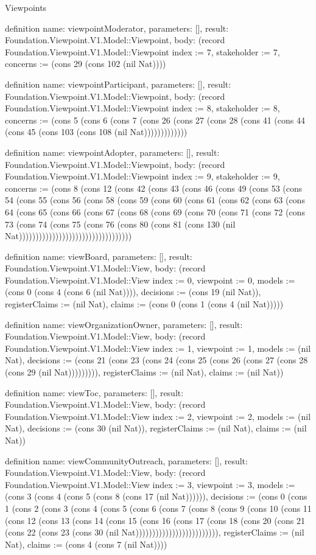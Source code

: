 \begin{lexlean}{Viewpoints}
\begin{semanticmodule}
definition{
  name: viewpointModerator,
  parameters: [],
  result: Foundation.Viewpoint.V1.Model::Viewpoint,
  body: (record Foundation.Viewpoint.V1.Model::Viewpoint {index := 7, stakeholder := 7, concerns := (cons 29 (cons 102 (nil Nat)))})
}

definition{
  name: viewpointParticipant,
  parameters: [],
  result: Foundation.Viewpoint.V1.Model::Viewpoint,
  body: (record Foundation.Viewpoint.V1.Model::Viewpoint {index := 8, stakeholder := 8, concerns := (cons 5 (cons 6 (cons 7 (cons 26 (cons 27 (cons 28 (cons 41 (cons 44 (cons 45 (cons 103 (cons 108 (nil Nat))))))))))))})
}

definition{
  name: viewpointAdopter,
  parameters: [],
  result: Foundation.Viewpoint.V1.Model::Viewpoint,
  body: (record Foundation.Viewpoint.V1.Model::Viewpoint {index := 9, stakeholder := 9, concerns := (cons 8 (cons 12 (cons 42 (cons 43 (cons 46 (cons 49 (cons 53 (cons 54 (cons 55 (cons 56 (cons 58 (cons 59 (cons 60 (cons 61 (cons 62 (cons 63 (cons 64 (cons 65 (cons 66 (cons 67 (cons 68 (cons 69 (cons 70 (cons 71 (cons 72 (cons 73 (cons 74 (cons 75 (cons 76 (cons 80 (cons 81 (cons 130 (nil Nat)))))))))))))))))))))))))))))))))})
}

definition{
  name: viewBoard,
  parameters: [],
  result: Foundation.Viewpoint.V1.Model::View,
  body: (record Foundation.Viewpoint.V1.Model::View {index := 0, viewpoint := 0, models := (cons 0 (cons 4 (cons 6 (nil Nat)))), decisions := (cons 19 (nil Nat)), registerClaims := (nil Nat), claims := (cons 0 (cons 1 (cons 4 (nil Nat))))})
}

definition{
  name: viewOrganizationOwner,
  parameters: [],
  result: Foundation.Viewpoint.V1.Model::View,
  body: (record Foundation.Viewpoint.V1.Model::View {index := 1, viewpoint := 1, models := (nil Nat), decisions := (cons 21 (cons 23 (cons 24 (cons 25 (cons 26 (cons 27 (cons 28 (cons 29 (nil Nat))))))))), registerClaims := (nil Nat), claims := (nil Nat)})
}

definition{
  name: viewToc,
  parameters: [],
  result: Foundation.Viewpoint.V1.Model::View,
  body: (record Foundation.Viewpoint.V1.Model::View {index := 2, viewpoint := 2, models := (nil Nat), decisions := (cons 30 (nil Nat)), registerClaims := (nil Nat), claims := (nil Nat)})
}

definition{
  name: viewCommunityOutreach,
  parameters: [],
  result: Foundation.Viewpoint.V1.Model::View,
  body: (record Foundation.Viewpoint.V1.Model::View {index := 3, viewpoint := 3, models := (cons 3 (cons 4 (cons 5 (cons 8 (cons 17 (nil Nat)))))), decisions := (cons 0 (cons 1 (cons 2 (cons 3 (cons 4 (cons 5 (cons 6 (cons 7 (cons 8 (cons 9 (cons 10 (cons 11 (cons 12 (cons 13 (cons 14 (cons 15 (cons 16 (cons 17 (cons 18 (cons 20 (cons 21 (cons 22 (cons 23 (cons 30 (nil Nat))))))))))))))))))))))))), registerClaims := (nil Nat), claims := (cons 4 (cons 7 (nil Nat)))})
}


\end{semanticmodule}
\end{lexlean}
